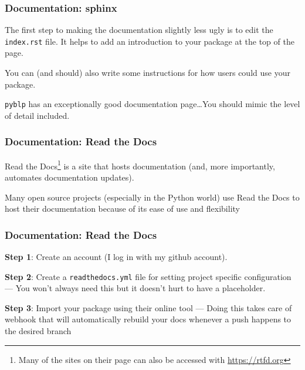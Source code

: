 \documentclass[10pt]{beamer}
\begin{document}
  \begin{frame} \frametitle{Documentation: sphinx}

    The first step to making the documentation slightly less ugly is to edit the
    \texttt{index.rst} file. It helps to add an introduction to your package at the top
    of the page.

    \vspace{0.25cm}

    You can (and should) also write some instructions for how users could use your
    package.

    \vspace{0.25cm}

    \texttt{pyblp} has an exceptionally good documentation page\dots You should mimic
    the level of detail included.

  \end{frame}

  \begin{frame} \frametitle{Documentation: Read the Docs}

    Read the Docs\footnote{Many of the sites on their page can also be accessed with
    \href{https://www.urbandictionary.com/define.php?term=RTFD}{https://rtfd.org}} is a
    site that hosts documentation (and, more importantly, automates documentation
    updates).

    \vspace{0.25cm}

    Many open source projects (especially in the Python world) use Read the Docs to host
    their documentation because of its ease of use and flexibility

  \end{frame}

  \begin{frame} \frametitle{Documentation: Read the Docs}

    \textbf{Step 1}: Create an account (I log in with my github account).

    \vspace{0.25cm}

    \textbf{Step 2}: Create a \texttt{readthedocs.yml} file for setting project
    specific configuration --- You won't always need this but it doesn't hurt to have a
    placeholder.

    \vspace{0.25cm}

    \textbf{Step 3}: Import your package using their online tool --- Doing this takes
    care of webhook that will automatically rebuild your docs whenever a push happens
    to the desired branch

  \end{frame}
\end{document}
